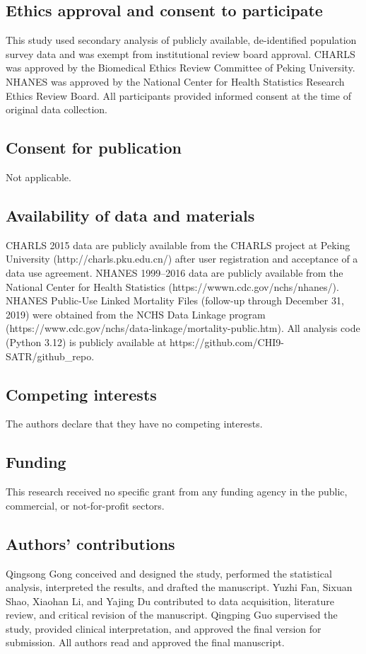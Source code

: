 \documentclass[11pt,a4paper]{article}
\begin{document}
\subsection*{Ethics approval and consent to participate}
This study used secondary analysis of publicly available, de-identified population survey data and was exempt from institutional review board approval. CHARLS was approved by the Biomedical Ethics Review Committee of Peking University. NHANES was approved by the National Center for Health Statistics Research Ethics Review Board. All participants provided informed consent at the time of original data collection.

\subsection*{Consent for publication}
Not applicable.

\subsection*{Availability of data and materials}
CHARLS 2015 data are publicly available from the CHARLS project at Peking University (http://charls.pku.edu.cn/) after user registration and acceptance of a data use agreement. NHANES 1999--2016 data are publicly available from the National Center for Health Statistics (https://wwwn.cdc.gov/nchs/nhanes/). NHANES Public-Use Linked Mortality Files (follow-up through December 31, 2019) were obtained from the NCHS Data Linkage program (https://www.cdc.gov/nchs/data-linkage/mortality-public.htm). All analysis code (Python 3.12) is publicly available at https://github.com/CHI9-SATR/github{\_}repo.

\subsection*{Competing interests}
The authors declare that they have no competing interests.

\subsection*{Funding}
This research received no specific grant from any funding agency in the public, commercial, or not-for-profit sectors.

\subsection*{Authors' contributions}
Qingsong Gong conceived and designed the study, performed the statistical analysis, interpreted the results, and drafted the manuscript. Yuzhi Fan, Sixuan Shao, Xiaohan Li, and Yajing Du contributed to data acquisition, literature review, and critical revision of the manuscript. Qingping Guo supervised the study, provided clinical interpretation, and approved the final version for submission. All authors read and approved the final manuscript.
\end{document}
